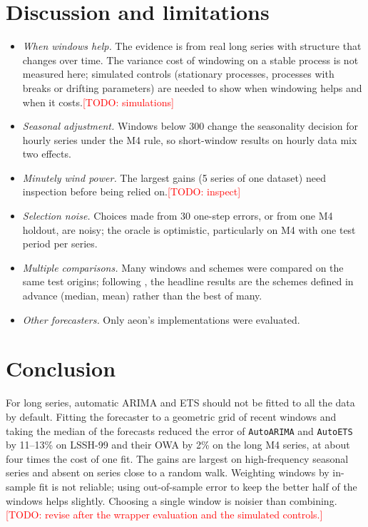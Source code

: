 \documentclass[11pt]{article}
\newcommand{\todo}[1]{\textcolor{red}{[TODO: #1]}}
\begin{document}
\section{Discussion and limitations}

\begin{itemize}
\item \emph{When windows help.} The evidence is from real long series with
structure that changes over time. The variance cost of windowing on a stable
process is not measured here; simulated controls (stationary processes,
processes with breaks or drifting parameters) are needed to show when
windowing helps and when it costs.\todo{simulations}
\item \emph{Seasonal adjustment.} Windows below 300 change the seasonality
decision for hourly series under the M4 rule, so short-window results on
hourly data mix two effects.
\item \emph{Minutely wind power.} The largest gains (5 series of one dataset)
need inspection before being relied on.\todo{inspect}
\item \emph{Selection noise.} Choices made from 30 one-step errors, or from one
M4 holdout, are noisy; the oracle is optimistic, particularly on M4 with one
test period per series.
\item \emph{Multiple comparisons.} Many windows and schemes were compared on the
same test origins; following \citet{rossi12robust}, the headline results are
the schemes defined in advance (median, mean) rather than the best of many.
\item \emph{Other forecasters.} Only aeon's implementations were evaluated.
\end{itemize}

\section{Conclusion}
For long series, automatic ARIMA and ETS should not be fitted to all the data
by default. Fitting the forecaster to a geometric grid of recent windows and
taking the median of the forecasts reduced the error of \texttt{AutoARIMA} and
\texttt{AutoETS} by 11--13\% on LSSH-99 and their OWA by 2\% on the long M4
series, at about four times the cost of one fit. The gains are largest on
high-frequency seasonal series and absent on series close to a random walk.
Weighting windows by in-sample fit is not reliable; using out-of-sample error
to keep the better half of the windows helps slightly. Choosing a single window
is noisier than combining. \todo{revise after the wrapper evaluation and the
simulated controls.}



\end{document}
